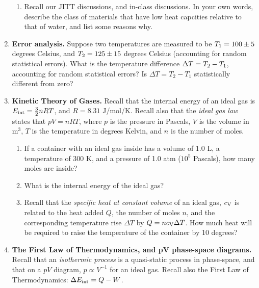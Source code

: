 \documentclass[10pt]{article}
\begin{document}
\begin{enumerate}
\begin{enumerate}
\item Recall our JITT discussions, and in-class discussions.  In your own words, describe the class of materials that have low heat capcities relative to that of water, and list some reasons why. \\ \vspace{3cm}
\end{enumerate}
\item \textbf{Error analysis.}  Suppose two temperatures are measured to be $T_{\rm 1} = 100 \pm 5$ degrees Celsius, and $T_{\rm 2} = 125 \pm 15$ degrees Celsius (accounting for random statistical errors).  What is the temperature difference $\Delta T = T_{\rm 2} - T_{\rm 1}$, accounting for random statistical errors?  Is $\Delta T = T_2 - T_1$ statistically different from zero? \\ \vspace{2cm}
\item \textbf{Kinetic Theory of Gases.} Recall that the internal energy of an ideal gas is $E_{\rm int} = \frac{3}{2}n R T$, and $R = 8.31$ J/mol/K.  Recall also that the \textit{ideal gas law} states that $pV = n R T$, where $p$ is the pressure in Pascals, $V$ is the volume in m$^3$, $T$ is the temperature in degrees Kelvin, and $n$ is the number of moles.
\begin{enumerate}
\item If a container with an ideal gas inside has a volume of 1.0 L, a temperature of 300 K, and a pressure of 1.0 atm ($10^5$ Pascals), how many moles are inside? \\ \vspace{2cm}
\item What is the internal energy of the ideal gas? \\ \vspace{2cm}
\item Recall that the \textit{specific heat at constant volume} of an ideal gas, $c_{\rm V}$ is related to the heat added $Q$, the number of moles $n$, and the corresponding temperature rise $\Delta T$ by $Q = n c_{\rm V} \Delta T$.  How much heat will be required to raise the temperature of the container by 10 degrees? \\ \vspace{2cm}
\end{enumerate}
\item \textbf{The First Law of Thermodynamics, and pV phase-space diagrams.}  Recall that an \textit{isothermic process} is a quasi-static process in phase-space, and that on a $pV$ diagram, $p \propto V^{-1}$ for an ideal gas.  Recall also the First Law of Thermodynamics: $\Delta E_{\rm int} = Q - W$.

\end{enumerate}
\end{document}
